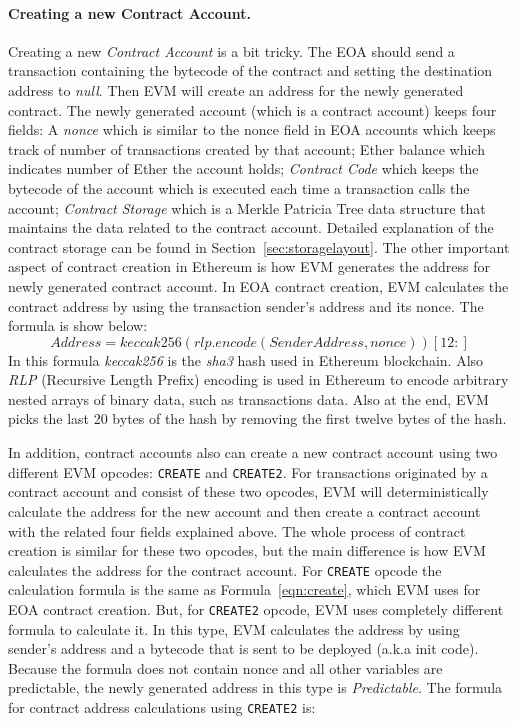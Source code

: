 \paragraph{Creating a new Contract Account.}
Creating a new \textit{Contract Account} is a bit tricky. The EOA should send a transaction containing the bytecode of the contract and setting the destination address to \emph{null}. Then EVM will create an address for the newly generated contract. The newly generated account (which is a contract account) keeps four fields: A \textit{nonce} which is similar to the nonce field in EOA accounts which keeps track of number of transactions created by that account; Ether balance which indicates number of Ether the account holds; \textit{Contract Code} which keeps the bytecode of the account which is executed each time a transaction calls the account; \textit{Contract Storage} which is a Merkle Patricia Tree data structure that maintains the data related to the contract account. Detailed explanation of the contract storage can be found in Section~\ref{sec:storagelayout}. 
The other important aspect of contract creation in Ethereum is how EVM generates the address for newly generated contract account. In EOA contract creation, EVM calculates the contract address by using the transaction sender's address and its nonce. The formula is show below:
\begin{equation}
    \label{eqn:create}
    Address = keccak256(rlp.encode(Sender Address, nonce))[12:]
\end{equation}
In this formula \textit{keccak256} is the \textit{sha3} hash used in Ethereum blockchain. Also \textit{RLP} (Recursive Length Prefix) encoding is used in Ethereum to encode arbitrary nested arrays of binary data, such as transactions data. Also at the end, EVM picks the last 20 bytes of the hash by removing the first twelve bytes of the hash.

In addition, contract accounts also can create a new contract account using two different EVM opcodes: \texttt{CREATE} and \texttt{CREATE2}. For transactions originated by a contract account and consist of these two opcodes, EVM will deterministically calculate the address for the new account and then create a contract account with the related four fields explained above. The whole process of contract creation is similar for these two opcodes, but the main difference is how EVM calculates the address for the contract account. For \texttt{CREATE} opcode the calculation formula is the same as Formula~\ref{eqn:create}, which EVM uses for EOA contract creation. But, for \texttt{CREATE2} opcode, EVM uses completely different formula to calculate it. In this type, EVM calculates the address by using sender's address and a bytecode that is sent to be deployed (a.k.a init code). Because the formula does not contain nonce and all other variables are predictable, the newly generated address in this type is \emph{Predictable}. The formula for contract address calculations using \texttt{CREATE2} is:

